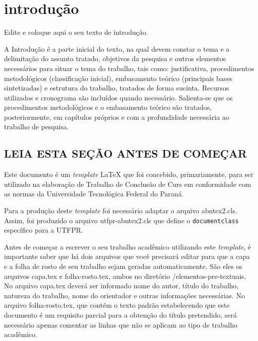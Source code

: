 \chapter{introdução}
\label{chap:introducao}

Edite e coloque aqui o seu texto de introdução.

A Introdução é a parte inicial do texto, na qual devem constar o tema e a delimitação do assunto tratado, objetivos da pesquisa e outros elementos necessários para situar o tema do trabalho, tais como: justificativa, procedimentos metodológicos (classificação inicial), embasamento teórico (principais bases sintetizadas) e estrutura do trabalho, tratados de forma sucinta. Recursos utilizados e cronograma são incluídos quando necessário. Salienta-se que os procedimentos metodológicos e o embasamento teórico são tratados, posteriormente, em capítulos próprios e com a profundidade necessária ao trabalho de pesquisa.

\section{LEIA ESTA SEÇÃO ANTES DE COMEÇAR}
\label{sec:antesleiame}

Este documento é um \emph{template} \LaTeX{} que foi concebido, primariamente, para ser utilizado na elaboração de Trabalho de Conclusão de Curs em conformidade com as normas da Universidade Tecnológica Federal do Paraná.

Para a produção deste \emph{template} foi necessário adaptar o arquivo {\ttfamily abntex2.cls}. Assim, foi produzido o arquivo {\ttfamily utfpr-abntex2.cls} que define o \verb|documentclass| específico para a UTFPR.

Antes de começar a escrever o seu trabalho acadêmico utilizando este \emph{template}, é importante saber que há dois arquivos que você precisará editar para que a capa e a folha de rosto de seu trabalho sejam geradas automaticamente.
São eles os arquivos {\ttfamily capa.tex} e {\ttfamily folha-rosto.tex}, ambos no diretório  {\ttfamily /elementos-pre-textuais}.
No arquivo {\ttfamily capa.tex} deverá ser informado nome do autor, título do trabalho, natureza do trabalho, nome do orientador e outras informações necessárias.
No arquivo {\ttfamily folha-rosto.tex}, que contém o texto padrão estabelecendo que este documento é um requisito parcial para a obtenção do título pretendido, será necessário apenas comentar as linhas que não se aplicam ao tipo de trabalho acadêmico.

